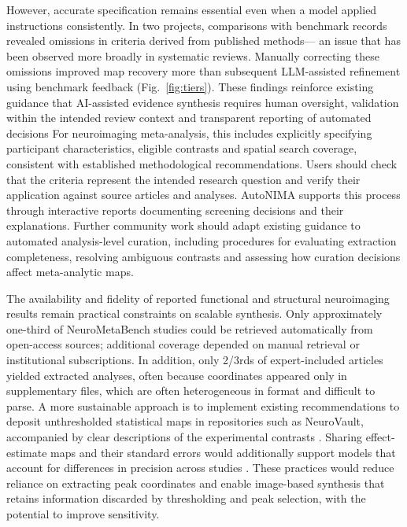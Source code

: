 However, accurate specification remains essential even when a model applied instructions consistently. In two projects, comparisons with benchmark records revealed omissions in criteria derived from published methods--- an issue that has been observed more broadly in systematic reviews\cite{Wang2020-xj}. Manually correcting these omissions improved map recovery more than subsequent LLM-assisted refinement using benchmark feedback (Fig.~\ref{fig:tiers}). These findings reinforce existing guidance that AI-assisted evidence synthesis requires human oversight, validation within the intended review context and transparent reporting of automated decisions\cite{Flemyng2025-in} For neuroimaging meta-analysis, this includes explicitly specifying participant characteristics, eligible contrasts and spatial search coverage, consistent with established methodological recommendations\cite{Muller2018-zo}. Users should check that the criteria represent the intended research question and verify their application against source articles and analyses. AutoNIMA supports this process through interactive reports documenting screening decisions and their explanations. Further community work should adapt existing guidance to automated analysis-level curation, including procedures for evaluating extraction completeness, resolving ambiguous contrasts and assessing how curation decisions affect meta-analytic maps.

The availability and fidelity of reported functional and structural neuroimaging results remain practical constraints on scalable synthesis. Only approximately one-third of NeuroMetaBench studies could be retrieved automatically from open-access sources; additional coverage depended on manual retrieval or institutional subscriptions. In addition, only 2/3rds of expert-included articles yielded extracted analyses, often because coordinates appeared only in supplementary files, which are often heterogeneous in format and difficult to parse. A more sustainable approach is to implement existing recommendations to deposit unthresholded statistical maps in repositories such as NeuroVault, accompanied by clear descriptions of the experimental contrasts \cite{Gorgolewski2015-gu,Nichols2017-sw}. Sharing effect-estimate maps and their standard errors would additionally support models that account for differences in precision across studies \cite{Salimi-Khorshidi2009-yi}. These practices would reduce reliance on extracting peak coordinates and enable image-based synthesis that retains information discarded by thresholding and peak selection, with the potential to improve sensitivity.

